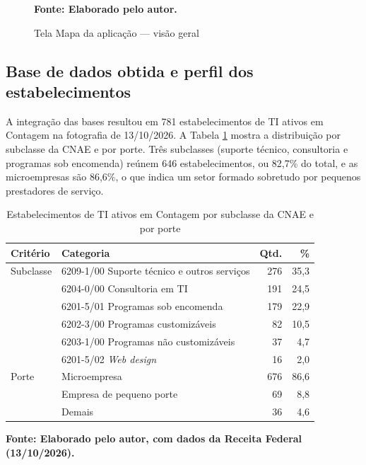 \begin{figure}[H]
    \centering
    \caption{Tela Mapa da aplicação --- visão geral}
    \label{fig:tela-mapa}
    \vspace{2pt}
    \par\vspace{2pt}\textbf{\footnotesize Fonte: Elaborado pelo autor.}
\end{figure}

\subsection{Base de dados obtida e perfil dos estabelecimentos}

A integração das bases resultou em 781 estabelecimentos de TI ativos em Contagem na fotografia de 13/10/2026.
A Tabela \ref{tab:perfil} mostra a distribuição por subclasse da CNAE e por porte.
Três subclasses (suporte técnico, consultoria e programas sob encomenda) reúnem 646 estabelecimentos, ou 82,7\% do total, e as microempresas são 86,6\%, o que indica um setor formado sobretudo por pequenos prestadores de serviço.

\begin{table}[H]
    \centering
    \caption{Estabelecimentos de TI ativos em Contagem por subclasse da CNAE e por porte}
    \label{tab:perfil}
    \small
    \begin{tabular}{llrr}
        \hline
        \textbf{Critério} & \textbf{Categoria} & \textbf{Qtd.} & \textbf{\%} \\
        \hline
        Subclasse & 6209-1/00 Suporte técnico e outros serviços & 276 & 35,3 \\
        & 6204-0/00 Consultoria em TI & 191 & 24,5 \\
        & 6201-5/01 Programas sob encomenda & 179 & 22,9 \\
        & 6202-3/00 Programas customizáveis & 82 & 10,5 \\
        & 6203-1/00 Programas não customizáveis & 37 & 4,7 \\
        & 6201-5/02 \textit{Web design} & 16 & 2,0 \\
        \hline
        Porte & Microempresa & 676 & 86,6 \\
        & Empresa de pequeno porte & 69 & 8,8 \\
        & Demais & 36 & 4,6 \\
        \hline
    \end{tabular}
    \par\vspace{3pt}\textbf{\footnotesize Fonte: Elaborado pelo autor, com dados da Receita Federal (13/10/2026).}
\end{table}

